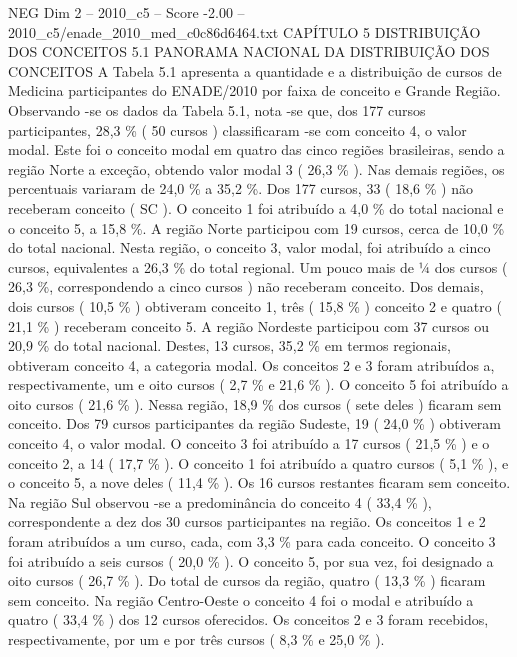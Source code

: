 \begin{textsample}{NEG Dim 2 – 2010\_c5 – Score -2.00 – 2010\_c5/enade\_2010\_med\_c0c86d6464.txt}  \label{ex:f2_neg_107}
CAPÍTULO 5 DISTRIBUIÇÃO DOS CONCEITOS 5.1 PANORAMA NACIONAL DA DISTRIBUIÇÃO DOS CONCEITOS A Tabela 5.1 apresenta a quantidade e a distribuição de cursos de Medicina participantes do ENADE/2010 por faixa de conceito e Grande Região.
Observando -se os dados da Tabela 5.1, nota -se que, dos 177 cursos participantes, 28,3 \% ( 50 cursos ) classificaram -se com conceito 4, o valor modal.
Este foi o conceito modal em quatro das cinco regiões brasileiras, sendo a região Norte a exceção, obtendo valor modal 3 ( 26,3 \% ).
Nas demais regiões, os percentuais variaram de 24,0 \% a 35,2 \%.
Dos 177 cursos, 33 ( 18,6 \% ) não receberam conceito ( SC ).
O conceito 1 foi atribuído a 4,0 \% do total nacional e o conceito 5, a 15,8 \%.
A região Norte participou com 19 cursos, cerca de 10,0 \% do total nacional.
Nesta região, o conceito 3, valor modal, foi atribuído a cinco cursos, equivalentes a 26,3 \% do total regional.
Um pouco mais de ¼ dos cursos ( 26,3 \%, correspondendo a cinco cursos ) não receberam conceito.
Dos demais, dois cursos ( 10,5 \% ) obtiveram conceito 1, três ( 15,8 \% ) conceito 2 e quatro ( 21,1 \% ) receberam conceito 5.
A região Nordeste participou com 37 cursos ou 20,9 \% do total nacional.
Destes, 13 cursos, 35,2 \% em termos regionais, obtiveram conceito 4, a categoria modal.
Os conceitos 2 e 3 foram atribuídos a, respectivamente, um e oito cursos ( 2,7 \% e 21,6 \% ).
O conceito 5 foi atribuído a oito cursos ( 21,6 \% ).
Nessa região, 18,9 \% dos cursos ( sete deles ) ficaram sem conceito.
Dos 79 cursos participantes da região Sudeste, 19 ( 24,0 \% ) obtiveram conceito 4, o valor modal.
O conceito 3 foi atribuído a 17 cursos ( 21,5 \% ) e o conceito 2, a 14 ( 17,7 \% ).
O conceito 1 foi atribuído a quatro cursos ( 5,1 \% ), e o conceito 5, a nove deles ( 11,4 \% ).
Os 16 cursos restantes ficaram sem conceito.
Na região Sul observou -se a predominância do conceito 4 ( 33,4 \% ), correspondente a dez dos 30 cursos participantes na região.
Os conceitos 1 e 2 foram atribuídos a um curso, cada, com 3,3 \% para cada conceito.
O conceito 3 foi atribuído a seis cursos ( 20,0 \% ).
O conceito 5, por sua vez, foi designado a oito cursos ( 26,7 \% ).
Do total de cursos da região, quatro ( 13,3 \% ) ficaram sem conceito.
Na região Centro-Oeste o conceito 4 foi o modal e atribuído a quatro ( 33,4 \% ) dos 12 cursos oferecidos.
Os conceitos 2 e 3 foram recebidos, respectivamente, por um e por três cursos ( 8,3 \% e 25,0 \% ).

\end{textsample}
